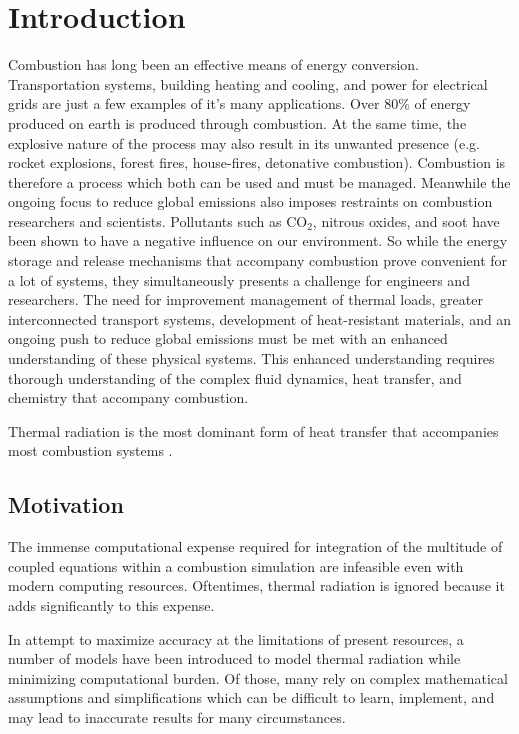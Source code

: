 \addchapheadtotoc

\chapter{Introduction} \label{chapter:Introduction}
Combustion has long been an effective means of energy conversion. Transportation systems, building heating and cooling, and power for electrical grids are just a few examples of it's many applications. Over 80\% of energy produced on earth is produced through combustion. 
At the same time, the explosive nature of the process may also result in its unwanted presence (e.g. rocket explosions, forest fires, house-fires, detonative combustion).
Combustion is therefore a process which both can be used and must be managed. 
Meanwhile the ongoing focus to reduce global emissions also imposes restraints on combustion researchers and scientists. Pollutants such as CO${}_2$, nitrous oxides, and soot have been shown to have a negative influence on our environment.
So while the energy storage and release mechanisms that accompany combustion prove convenient for a lot of systems, they simultaneously presents a challenge for engineers and researchers.
The need for improvement management of thermal loads, greater interconnected transport systems, development of heat-resistant materials, and an ongoing push to reduce global emissions must be met with an enhanced understanding of these physical systems.
This enhanced understanding requires thorough understanding of the complex fluid dynamics, heat transfer, and chemistry that accompany combustion.

Thermal radiation is the most dominant form of heat transfer that accompanies most combustion systems \cite{Coelho2018RadiativeSystems}. 


\section{Motivation}
The immense computational expense required for integration of the multitude of coupled equations within a combustion simulation are infeasible even with modern computing resources. Oftentimes, thermal radiation is ignored because it adds significantly to this expense.

In attempt to maximize accuracy at the limitations of present resources, a number of models have been introduced to model thermal radiation while minimizing computational burden.
Of those, many rely on complex mathematical assumptions and simplifications which can be difficult to learn, implement, and may lead to inaccurate results for many circumstances. 


